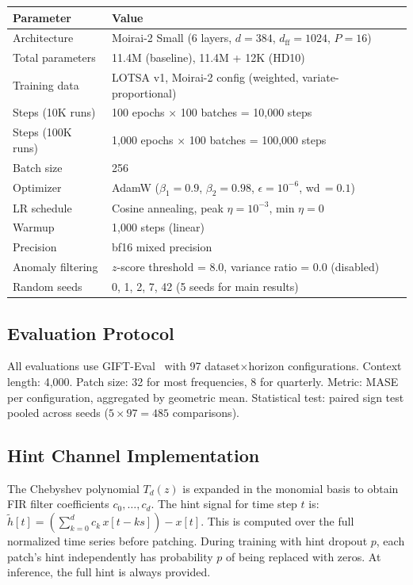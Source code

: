 \documentclass{article}
\begin{document}
\begin{center}
\small
\begin{tabular}{ll}
\toprule
\textbf{Parameter} & \textbf{Value} \\
\midrule
Architecture & Moirai-2 Small (6 layers, $d{=}384$, $d_{\text{ff}}{=}1024$, $P{=}16$) \\
Total parameters & 11.4M (baseline), 11.4M + 12K (HD10) \\
Training data & LOTSA v1, Moirai-2 config (weighted, variate-proportional) \\
Steps (10K runs) & 100 epochs $\times$ 100 batches = 10,000 steps \\
Steps (100K runs) & 1,000 epochs $\times$ 100 batches = 100,000 steps \\
Batch size & 256 \\
Optimizer & AdamW ($\beta_1{=}0.9$, $\beta_2{=}0.98$, $\epsilon{=}10^{-6}$, wd$\,{=}0.1$) \\
LR schedule & Cosine annealing, peak $\eta{=}10^{-3}$, min $\eta{=}0$ \\
Warmup & 1,000 steps (linear) \\
Precision & bf16 mixed precision \\
Anomaly filtering & $z$-score threshold = 8.0, variance ratio = 0.0 (disabled) \\
Random seeds & 0, 1, 2, 7, 42 (5 seeds for main results) \\
\bottomrule
\end{tabular}
\end{center}

\subsection{Evaluation Protocol}

All evaluations use GIFT-Eval~\citep{vijay2024gifteval} with 97 dataset$\times$horizon configurations. Context length: 4,000. Patch size: 32 for most frequencies, 8 for quarterly. Metric: MASE per configuration, aggregated by geometric mean. Statistical test: paired sign test pooled across seeds ($5 \times 97 = 485$ comparisons).

\subsection{Hint Channel Implementation}

The Chebyshev polynomial $T_d(z)$ is expanded in the monomial basis to obtain FIR filter coefficients $c_0, \ldots, c_d$. The hint signal for time step $t$ is:
$\tilde{h}[t] = \left(\sum_{k=0}^{d} c_k \, x[t - ks]\right) - x[t]$.
This is computed over the full normalized time series before patching. During training with hint dropout $p$, each patch's hint independently has probability $p$ of being replaced with zeros. At inference, the full hint is always provided.
\end{document}
